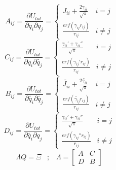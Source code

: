 \documentclass{letter}
\begin{document}
	\newline
	\begin{equation}
		A_{ij}=\frac{\partial U_{tot}}{\partial q_i \partial q_j} = 
		\begin{cases}
			J_{ii}+\frac{2\gamma_{ii}}{\sqrt{\pi}} & i =j\\
			\frac{erf(\gamma_{ij}r_{ij})}{r_{ij}} & i \neq j
		\end{cases}
	\end{equation}
	\begin{equation}
		C_{ij}=\frac{\partial U_{tot}}{\partial q_i \partial \tilde{q_j}} =
		\begin{cases}
			\frac{\gamma_{ii}'+\gamma_{ii}''}{\sqrt{\pi}} & i=j \\
			\frac{erf(\gamma_{ij}'r_{ij})}{r_{ij}} & i\neq j
		\end{cases}
	\end{equation}
	\begin{equation}
		B_{ij}=\frac{\partial U_{tot}}{\partial \tilde{q_i} \partial \tilde{q_j}} =
		\begin{cases}
			\tilde{J_{ii}}+\frac{2\tilde{\gamma_{ii}}}{\sqrt{\pi}} & i=j\\
			\frac{erf(\tilde{\gamma_{ij}}r_{ij})}{r_{ij}} & i \neq j
		\end{cases}
	\end{equation}
	\begin{equation}
		D_{ij}=\frac{\partial U_{tot}}{\partial \tilde{q_i} \partial q_j} = 
		\begin{cases}
			\frac{\gamma_{ii}'+\gamma_{ii}''}{\sqrt{\pi}} & i=j \\
			\frac{erf(\gamma_{ij}''r_{ij})}{r_{ij}} & i\neq j
		\end{cases}
	\end{equation}
	$$
		\Lambda Q = \Xi \hspace{10pt} ; \hspace{10pt}  \Lambda =
	\begin{bmatrix}
		A & C \\
		D & B
	\end{bmatrix}
	$$
\end{document}
